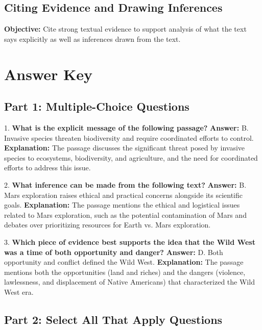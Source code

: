 \documentclass[12pt]{article}
\begin{document}
\subsection*{Citing Evidence and Drawing Inferences}
\onehalfspacing

\begin{tcolorbox}[colframe=black!40, colback=gray!0, title=Learning Objective]
\textbf{Objective:} Cite strong textual evidence to support analysis of what the text says explicitly as well as inferences drawn from the text.
\end{tcolorbox}

\section*{Answer Key}

\subsection*{Part 1: Multiple-Choice Questions}

1. \textbf{What is the explicit message of the following passage?}  
\textbf{Answer:} B. Invasive species threaten biodiversity and require coordinated efforts to control.  
\textbf{Explanation:} The passage discusses the significant threat posed by invasive species to ecosystems, biodiversity, and agriculture, and the need for coordinated efforts to address this issue.

\vspace{1cm}
2. \textbf{What inference can be made from the following text?}  
\textbf{Answer:} B. Mars exploration raises ethical and practical concerns alongside its scientific goals.  
\textbf{Explanation:} The passage mentions the ethical and logistical issues related to Mars exploration, such as the potential contamination of Mars and debates over prioritizing resources for Earth vs. Mars exploration.

\vspace{1cm}
3. \textbf{Which piece of evidence best supports the idea that the Wild West was a time of both opportunity and danger?}  
\textbf{Answer:} D. Both opportunity and conflict defined the Wild West.  
\textbf{Explanation:} The passage mentions both the opportunities (land and riches) and the dangers (violence, lawlessness, and displacement of Native Americans) that characterized the Wild West era.

\subsection*{Part 2: Select All That Apply Questions}
\end{document}

